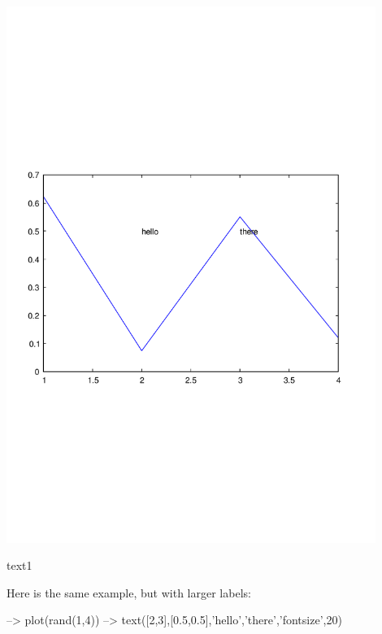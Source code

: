  
\begin{DoxyImage}
\includegraphics[width=12cm]{text1}
\caption{text1}
\end{DoxyImage}
 Here is the same example, but with larger labels\-:


\begin{DoxyVerbInclude}
--> plot(rand(1,4))
--> text([2,3],[0.5,0.5],{'hello','there'},'fontsize',20)
\end{DoxyVerbInclude}


